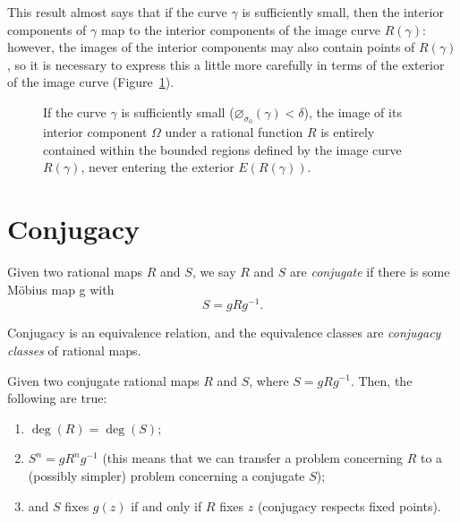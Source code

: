 This result almost says that if the curve $\gamma$ is sufficiently small, then
the interior components of $\gamma$ map to the interior components of the image
curve $R(\gamma)$: however, the images of the interior components may also
contain points of $R(\gamma)$, so it is necessary to express this a little more
carefully in terms of the exterior of the image curve
(Figure~\ref{fig:interior_of_curve_mobius_transformed}).

\begin{figure}[htbp]
    \centering
    \resizebox{\textwidth}{!}{}
    \caption{If the curve $\gamma$ is sufficiently small
    ($\diameter_{\sigma_0}(\gamma) < \delta$), the image of its interior
    component $\Omega$ under a rational function $R$ is entirely contained
    within the bounded regions defined by the image curve $R(\gamma)$, never
    entering the exterior $E(R(\gamma))$.}
    \label{fig:interior_of_curve_mobius_transformed}
\end{figure}

\section{Conjugacy}
\label{sec:conjugacy}

\begin{definition}
    Given two rational maps $R$ and $S$, we say $R$ and $S$ are \emph{conjugate}
    if there is some Möbius map g with
    \begin{equation*}
        S = g R g^{-1}.
    \end{equation*}
\end{definition}

\begin{remark}
    Conjugacy is an equivalence relation, and the equivalence classes are
    \emph{conjugacy classes} of rational maps.
\end{remark}

\begin{remark}
    Given two conjugate rational maps $R$ and $S$, where $S = g R g^{-1}$. Then,
    the following are true:
    \begin{enumerate}[label=(\roman*)]
        \item $\deg(R) = \deg(S)$;
        \item $S^n = g R^n g^{-1}$ (this means that we can transfer a problem
        concerning $R$ to a (possibly simpler) problem concerning a conjugate
        $S$);
        \item and $S$ fixes $g(z)$ if and only if $R$ fixes $z$ (conjugacy
        respects fixed points).
    \end{enumerate}
\end{remark}

